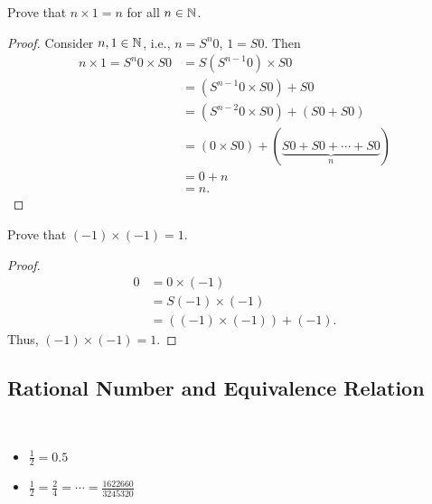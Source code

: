 \begin{example}
	Prove that $n\times 1 = n$ for all $n\in\mathbb{N}$.
	\begin{proof}
		Consider $n,1\in\mathbb{N}$, i.e., $n=S^n0$, $1=S0$. Then \begin{align*}
			n\times 1=S^n0\times S0&=S(S^{n-1}0)\times S0\\
			&= (S^{n-1}0\times S0)+S0 \\
			&= (S^{n-2}0\times S0) + (S0 + S0) \\ 
			&= (0\times S0) + (\underbrace{S0 + S0 + \cdots + S0}_n) \\
			&= 0 + n\\
			&= n.
		\end{align*}
	\end{proof}
\end{example}


\begin{example}
	Prove that $(-1)\times (-1) = 1$.
	\begin{proof}
		\begin{align*}
			0 &= 0\times (-1) \\
			&= S(-1)\times (-1) \\
			&= ((-1)\times (-1)) + (-1).
		\end{align*} Thus, $(-1)\times (-1)=1$.
	\end{proof}
\end{example}

\subsection{Rational Number and Equivalence Relation}
\begin{observation}
	\ \begin{itemize}
		\item $\frac{1}{2}=0.5$
		\item $\frac{1}{2}=\frac{2}{4}=\cdots=\frac{1622660}{3245320}$
	\end{itemize}
\end{observation}


